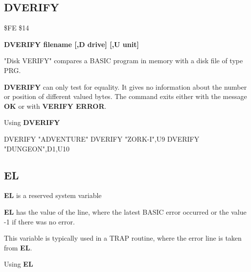 
\newpage
\subsection{DVERIFY}
\begin{description}[leftmargin=3cm,style=nextline]
\item [Token:] \$FE \$14
\item [Format:] {\bf DVERIFY filename [,D drive] [,U unit] }
\item [Usage:]
   "Disk VERIFY" compares a BASIC program
   in memory with a disk file of type PRG.

   \filenamedefinition

   \drivedefinition

   \unitdefinition

\item [Remarks:]
   {\bf DVERIFY} can only test for equality. It gives no information
   about the number or position of different valued bytes.
   The command exits either with the message {\bf OK}
   or with {\bf VERIFY ERROR}.

\item [Example:] Using {\bf DVERIFY}
\begin{screenoutput}
  DVERIFY "ADVENTURE"
  DVERIFY "ZORK-I",U9
  DVERIFY "DUNGEON",D1,U10
\end{screenoutput}
\end{description}


\newpage
\subsection{EL}
\begin{description}[leftmargin=3cm,style=nextline]
\item [Format:] {\bf EL} is a reserved system variable
\item [Usage:]  {\bf EL} has the value of the line, where
               the latest BASIC error
               occurred or the value -1 if there was no error.

This variable is typically used in a TRAP routine,
where the error line is taken from {\bf EL}.

\item [Example:] Using {\bf EL}
\end{description}

